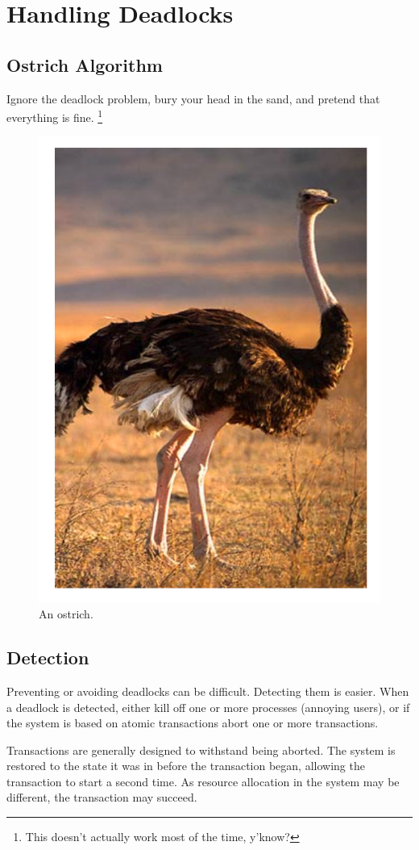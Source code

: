 \section{Handling Deadlocks}
\subsection{Ostrich Algorithm}
Ignore the deadlock problem, bury your head in the sand, and pretend that everything is fine. \footnote{This doesn't actually work most of the time, y'know?}

\begin{figure}[h]
\centering
\includegraphics[width=0.7\linewidth]{screenshot041}
\caption{An ostrich.}
\label{fig:screenshot041}
\end{figure}

\pagebreak
\subsection{Detection}
Preventing or avoiding deadlocks can be difficult. Detecting them is easier. When a deadlock is detected, either kill off one or more processes (annoying users), or if the system is based on atomic transactions abort one or more transactions.

Transactions are generally designed to withstand being aborted. The system is restored to the state it was in before the transaction began, allowing the transaction to start a second time. As resource allocation in the system may be different, the transaction may succeed.
